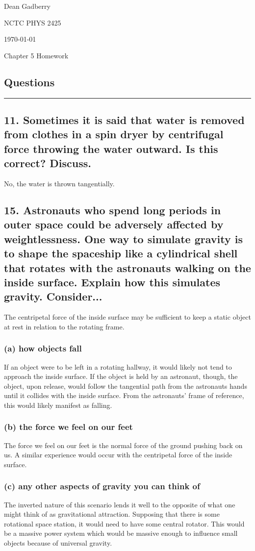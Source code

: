 \documentclass[12pt,a4paper,english]{article}
\begin{document}
\begin{flushright}
  Dean Gadberry

  NCTC PHYS 2425

  \today
\end{flushright}
\begin{center}
  {\large Chapter 5 Homework}
\end{center}
\begin{flushleft}

  \section*{Questions}
  \hrule
  \subsection{11. Sometimes it is said that water is removed from clothes in a spin dryer by centrifugal force throwing the water outward. Is this correct? Discuss.}
  No, the water is thrown tangentially. 
  \subsection{15. Astronauts who spend long periods in outer space could be adversely affected by weightlessness. One way to simulate gravity is to shape the spaceship like a cylindrical shell that rotates with the astronauts walking on the inside surface. Explain how this simulates gravity. Consider...}
  The centripetal force of the inside surface may be sufficient to keep a static object at rest in relation to the rotating frame.
  \subsubsection{(a) how objects fall}
  If an object were to be left in a rotating hallway, it would likely not tend to approach the inside surface. If the object is held by an astronaut, though, the object, upon release, would follow the tangential path from the astronauts hands until it collides with the inside surface. From the astronauts' frame of reference, this would likely manifest as falling.
  \subsubsection{(b) the force we feel on our feet}
  The force we feel on our feet is the normal force of the ground pushing back on us. A similar experience would occur with the centripetal force of the inside surface.
  \subsubsection{(c) any other aspects of gravity you can think of}
  The inverted nature of this scenario lends it well to the opposite of what one might think of as gravitational attraction. Supposing that there is some rotational space station, it would need to have some central rotator. This would be a massive power system which would be massive enough to influence small objects because of universal gravity.

\end{flushleft}
\end{document}
